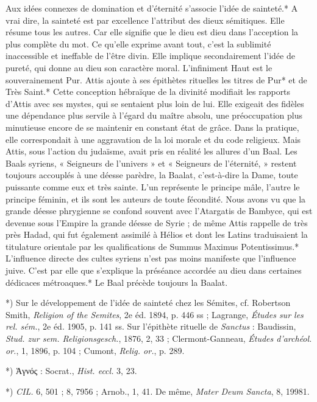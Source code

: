 \documentclass[a4paper, 11pt, oneside, polutonikogreek, french]{article}
\begin{document}
Aux idées connexes de domination et d'éternité s'associe l'idée de sainteté.* A vrai dire, la sainteté est par excellence l'attribut des dieux sémitiques. Elle résume tous les autres. Car elle signifie que le dieu est dieu dans l'acception la plus complète du mot. Ce qu'elle exprime avant tout, c'est la sublimité inaccessible et ineffable de l'être divin. Elle implique secondairement l'idée de pureté, qui donne au dieu son caractère moral. L'infiniment Haut est le souverainement Pur. Attis ajoute à ses épithètes rituelles les titres de Pur* et de Très Saint.* Cette conception hébraïque de la divinité modifiait les rapports d'Attis avec ses mystes, qui se sentaient plus loin de lui. Elle exigeait des fidèles une dépendance plus servile à l'égard du maître absolu, une préoccupation plus minutieuse encore de se maintenir en constant état de grâce. Dans la pratique, elle correspondait à une aggravation de la loi morale et du code religieux. Mais Attis, sous l'action du judaïsme, avait pris en réalité les allures d'un Baal. Les Baals syriens, « Seigneurs de l'univers » et « Seigneurs de l'éternité, » restent toujours accouplés à une déesse parèdre, la Baalat, c'est-à-dire la Dame, toute puissante comme eux et très sainte. L'un représente le principe mâle, l'autre le principe féminin, et ils sont les auteurs de toute fécondité. Nous avons vu que la grande déesse phrygienne se confond souvent avec l'Atargatis de Bambyce, qui est devenue sous l'Empire la grande déesse de Syrie ; de même Attis rappelle de très près Hadad, qui fut également assimilé à Hélios et dont les Latins traduisaient la titulature orientale par les qualifications de Summus Maximus Potentissimus.* L'influence directe des cultes syriens n'est pas moins manifeste que l'influence juive. C'est par elle que s'explique la préséance accordée au dieu dans certaines dédicaces métroaques.* Le Baal précède toujours la Baalat.

*) Sur le développement de l'idée de sainteté chez les Sémites, cf. Robertson Smith, \emph{Religion of the Semites}, 2e éd. 1894, p. 446 ss ; Lagrange, \emph{Études sur les rel. sém.}, 2e éd. 1905, p. 141 ss. Sur l'épithète rituelle de \emph{Sanctus} : Baudissin, \emph{Stud. zur sem. Religionsgesch.}, 1876, 2, 33 ; Clermont-Ganneau, \emph{Études d'archéol. or.}, 1, 1896, p. 104 ; Cumont, \emph{Relig. or.}, p. 289.

*)  Ἁγνός : Socrat., \emph{Hist. eccl.} 3, 23.

*) \emph{CIL.} 6, 501 ; 8, 7956 ; Arnob., 1, 41. De même, \emph{Mater Deum Sancta}, 8, 19981.
\end{document}
